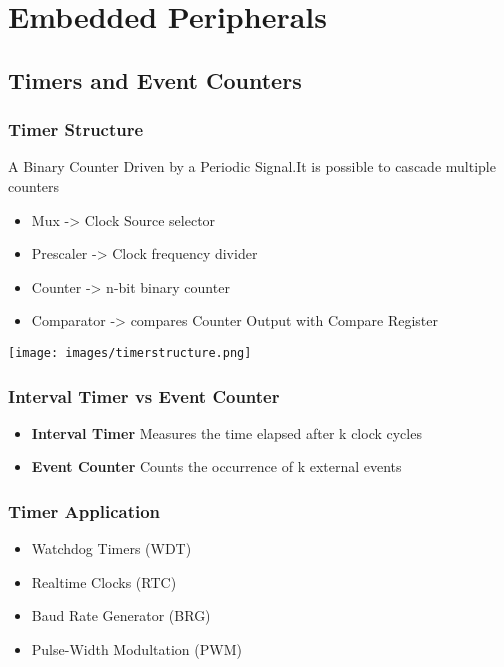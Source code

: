 \section{Embedded Peripherals}
\subsection{Timers and Event Counters}
\subsubsection{Timer Structure}
A Binary Counter Driven by a Periodic Signal.It is possible to cascade multiple counters\\
\vspace{1cm}
\begin{minipage}{9cm}
	\begin{itemize}
		\item Mux -> Clock Source selector
		\item Prescaler -> Clock frequency divider
		\item Counter -> n-bit binary counter
		\item Comparator -> compares Counter Output with Compare Register
	\end{itemize}
\end{minipage}
\begin{minipage}{10cm}
	\texttt{[image: images/timerstructure.png]} 
\end{minipage}
\begin{multicols}{2}
	\subsubsection{Interval Timer vs Event Counter}
	\begin{itemize}
		\item \textbf{Interval Timer}
		\subitem Measures the time elapsed after k clock cycles
		\item \textbf{Event Counter}
		\subitem Counts the occurrence of k external events
	\end{itemize}
	
	\subsubsection{Timer Application}
	\begin{itemize}
		\item Watchdog Timers (WDT)
		\item Realtime Clocks (RTC)
		\item Baud Rate Generator (BRG)
		\item Pulse-Width Modultation (PWM)
	\end{itemize}
\end{multicols}

